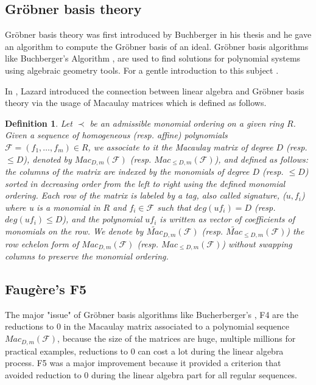 \documentclass[english]{article}
\newtheorem{definition}{Definition}[section]
\newcommand{\Mac}[3]{{Mac_{#1, #2}(\mathcal{#3})}}
\newcommand{\Mact}[3]{{\widetilde{Mac}_{#1, #2}(\mathcal{#3})}}
\begin{document}
		\subsection{Gröbner basis theory}
		Gröbner basis theory was first introduced by Buchberger in his thesis \cite{Buc} and he gave an algorithm to compute the Gröbner basis of an ideal.
		Gröbner basis algorithms like Buchberger's Algorithm \cite{Buc}, are used to find solutions for polynomial systems using algebraic geometry tools. For a gentle introduction to this subject \cite{CLS}.
		
		In \cite{Lazard83}, Lazard introduced the connection between linear algebra and Gröbner basis theory via the usage of Macaulay matrices \cite{Mac} which is defined as follows.
		
		\begin{definition}
			Let $\prec$ be an admissible monomial ordering on a given ring $R$. Given a sequence of homogeneous (resp. affine) polynomials $\mathcal{F} = (f_1,\dots,f_m) \in R$, we associate to it the Macaulay matrix of degree $D$ (resp. $\leq D$), denoted by $\Mac{D}{m}{\mathcal{F}}$ (resp. $\Mac{\leq D}{m}{\mathcal{F}}$), and defined as follows: the columns of the matrix are indexed by the monomials of degree $D$ (resp. $\leq D$) sorted in decreasing order from the left to right using the defined monomial ordering. Each row of the matrix is labeled by a tag, also called signature, ($u, f_i$) where u is a monomial in $R$ and $f_i \in \mathcal{F}$ such that $deg(uf_i) = D$ (resp. $deg(uf_i) \leq D$), and the polynomial $uf_i$ is written as vector of coefficients of monomials on the row. We denote by $\Mact{D}{m}{F}$ (resp. $\Mact{\leq D}{m}{F}$) the row echelon form of $\Mac{D}{m}{\mathcal{F}}$ (resp. $\Mac{\leq D}{m}{\mathcal{F}}$) without swapping columns to preserve the monomial ordering.
		\end{definition}
		
		\subsection{Faugère's F5}
		
		The major "issue" of Gröbner basis algorithms like Bucherberger's \cite{Buc}, F4 \cite{F02} are the reductions to 0 in the Macaulay matrix associated to a polynomial sequence $\Mac{D}{m}{F}$, because the size of the matrices are huge, multiple millions for practical examples,
		reductions to 0 can cost a lot during the linear algebra process. F5 \cite{F02} was a major improvement because it provided a criterion that avoided reduction to 0 during the linear algebra part for all regular sequences.
		
\end{document}
